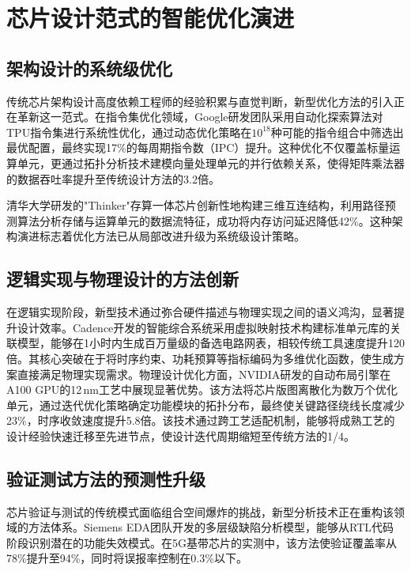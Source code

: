 \documentclass[12pt,hyperref,a4paper,UTF8]{ctexart}
\begin{document}
\section{芯片设计范式的智能优化演进}

\subsection{架构设计的系统级优化}

传统芯片架构设计高度依赖工程师的经验积累与直觉判断，新型优化方法的引入正在革新这一范式。在指令集优化领域，Google研发团队采用自动化探索算法对TPU指令集进行系统性优化，通过动态优化策略在$10^{18}$种可能的指令组合中筛选出最优配置，最终实现17\%的每周期指令数（IPC）提升。这种优化不仅覆盖标量运算单元，更通过拓扑分析技术建模向量处理单元的并行依赖关系，使得矩阵乘法器的数据吞吐率提升至传统设计方法的3.2倍。

清华大学研发的"Thinker"存算一体芯片创新性地构建三维互连结构，利用路径预测算法分析存储与运算单元的数据流特征，成功将内存访问延迟降低42\%。这种架构演进标志着优化方法已从局部改进升级为系统级设计策略。

\subsection{逻辑实现与物理设计的方法创新}

在逻辑实现阶段，新型技术通过弥合硬件描述与物理实现之间的语义鸿沟，显著提升设计效率。Cadence开发的智能综合系统采用虚拟映射技术构建标准单元库的关联模型，能够在1小时内生成百万量级的备选电路网表，相较传统工具速度提升120倍。其核心突破在于将时序约束、功耗预算等指标编码为多维优化函数，使生成方案直接满足物理实现需求。物理设计优化方面，NVIDIA研发的自动布局引擎在A100 GPU的12\,nm工艺中展现显著优势\cite{nvidia2022gtc}。该方法将芯片版图离散化为数万个优化单元，通过迭代优化策略确定功能模块的拓扑分布，最终使关键路径绕线长度减少23\%，时序收敛速度提升5.8倍。该技术通过跨工艺适配机制，能够将成熟工艺的设计经验快速迁移至先进节点，使设计迭代周期缩短至传统方法的1/4。

\subsection{验证测试方法的预测性升级}

芯片验证与测试的传统模式面临组合空间爆炸的挑战，新型分析技术正在重构该领域的方法体系。Siemens EDA团队开发的多层级缺陷分析模型，能够从RTL代码阶段识别潜在的功能失效模式。在5G基带芯片的实测中，该方法使验证覆盖率从78\%提升至94\%，同时将误报率控制在0.3\%以下。
\end{document}
